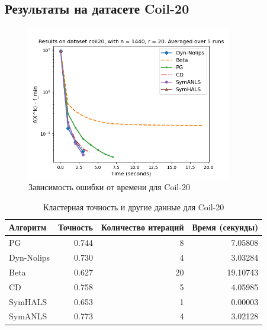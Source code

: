 \documentclass[a4paper,11pt]{article}
\begin{document}
\subsection{Результаты на датасете Coil-20}
\begin{figure}[h!]
    \centering \includegraphics[width=0.8\textwidth]{my_plot_coil20.png}
    \caption{Зависимость ошибки от времени для Coil-20}
    \label{fig:coil20}
\end{figure}
\begin{table}[h!]
    \centering
    \caption{Кластерная точность и другие данные для Coil-20}
    \label{tab:clustering_accuracy_coil20}
    \begin{tabular}{|l|r|r|r|}
        \hline
        Алгоритм & Точность & Количество итераций & Время (секунды) \\
        \hline
        PG & 0.744 & 8 & 7.05808 \\
        Dyn-Nolips & 0.730 & 4 & 3.03284 \\
        Beta & 0.627 & 20 & 19.10743 \\
        CD & 0.758 & 5 & 4.05985 \\
        SymHALS & 0.653 & 1 & 0.00003 \\
        SymANLS & 0.773 & 4 & 3.02128 \\
        \hline
    \end{tabular}
\end{table}
\newpage
\end{document}
